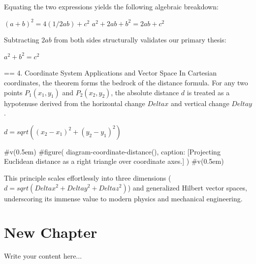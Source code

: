 Equating the two expressions yields the following algebraic breakdown:

$ (a + b)^2 = 4(1/2 a b) + c^2 $
$ a^2 + 2a b + b^2 = 2a b + c^2 $

Subtracting $2a b$ from both sides structurally validates our primary thesis:

$ a^2 + b^2 = c^2 $

== 4. Coordinate System Applications and Vector Space
In Cartesian coordinates, the theorem forms the bedrock of the distance formula. For any two points $P_1(x_1, y_1)$ and $P_2(x_2, y_2)$, the absolute distance $d$ is treated as a hypotenuse derived from the horizontal change $Delta x$ and vertical change $Delta y$.

$ d = sqrt((x_2 - x_1)^2 + (y_2 - y_1)^2) $

#v(0.5em)
#figure(
  diagram-coordinate-distance(),
  caption: [Projecting Euclidean distance as a right triangle over coordinate axes.]
)
#v(0.5em)

This principle scales effortlessly into three dimensions ($d = sqrt(Delta x^2 + Delta y^2 + Delta z^2)$) and generalized Hilbert vector spaces, underscoring its immense value to modern physics and mechanical engineering.

\chapter{New Chapter}
Write your content here...

